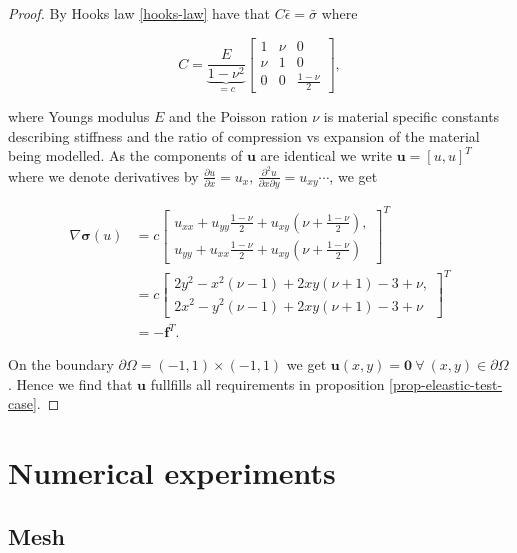 \documentclass[a4paper,english]{elsarticle}%
\begin{document}
\begin{proof}
By Hooks law \eqref{hooks-law} have that $C \bar{\epsilon} = \bar{\sigma}$ where 

\begin{equation*}
    C = \underbrace{\frac{E}{1-\nu^2}}_{=c}\begin{bmatrix}
        1&\nu&0\\
        \nu&1&0\\
        0&0&\frac{1-\nu}{2}
    \end{bmatrix},
\end{equation*}

\noindent where Youngs modulus $E$ and the Poisson ration $\nu$ is material specific constants describing stiffness and the ratio of compression vs expansion of the material being modelled. As the components of $\bm u$ are identical we write $\bm u = [u,u]^T$ where we denote derivatives by $\frac{\partial u}{\partial x} = u_x, \, \frac{\partial^2 u}{\partial x \partial y} = u_{xy} \cdots$,
we get

\begin{align}
    \nabla\bm\sigma(u) &= 
    c\begin{bmatrix}
        u_{xx} + u_{yy}\frac{1-\nu}{2} + u_{xy}(\nu + \frac{1-\nu}{2}),\\
        u_{yy} + u_{xx}\frac{1-\nu}{2} + u_{xy}(\nu + \frac{1-\nu}{2})
    \end{bmatrix}^T\\
    &= c\begin{bmatrix}
        2y^2 - x^2(\nu - 1) +2xy(\nu +1) - 3 + \nu, \\
        2x^2 - y^2(\nu - 1) +2xy(\nu +1) - 3 + \nu
    \end{bmatrix}^T\\
    &= -\bm f^T.
\end{align}

On the boundary $\partial \Omega = (-1,1)\times(-1,1)$ we get $\bm u(x,y) = \bm 0 \ \forall \ (x,y) \in \partial \Omega$.
Hence we find that $\bm u$ fullfills all requirements in proposition \ref{prop-eleastic-test-case}.  
\end{proof}


\section{Numerical experiments}
\subsection{Mesh}
\end{document}
